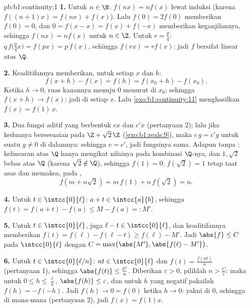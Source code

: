 \begin{solution}{pb:b1:continuity:1}
\textbf{1.} Untuk $n \in \N$: $f(nx) = n f(x)$ lewat induksi
(karena $f((n+1)x) = f(nx) + f(x)$). Lalu $f(0) = 2f(0)$ memberikan $f(0) =
0$, dan $0 = f(x - x) = f(x) + f(-x)$ memberikan keganjilannya, sehingga $f(nx) =
nf(x)$ untuk $n \in \Z$. Untuk $r = \frac pq$: $q\,f\bigl(\tfrac
pq x\bigr) = f(px) = p\,f(x)$, sehingga $f(rx) = r f(x)$: jadi $f$ bersifat
linear atas $\Q$.

\textbf{2.} Keaditifannya memberikan, untuk setiap $x$ dan $h$:
\[
f(x + h) - f(x) = f(h) = f(x_0 + h) - f(x_0) .
\]
Ketika $h \to 0$, ruas kanannya menuju $0$ menurut  di
$x_0$; sehingga $f(x + h) \to f(x)$: jadi  di setiap $x$. Lalu
\cref{exo:b1:continuity:11} menghasilkan $f(x) = f(1)\,x$.

\textbf{3.} Dua fungsi aditif yang  berbentuk
$cx$ dan $c'x$ (pertanyaan 2); lalu jika keduanya bersesuaian pada  
$\Z + \sqrt2\,\Z$ (\cref{exo:b1:reals:9}), maka $c\,g = c'g$ untuk
suatu $g \neq 0$ di dalamnya: sehingga $c = c'$, jadi fungsinya sama. Adapun tanpa
: kelinearan atas $\Q$ hanya mengikat nilainya pada
kombinasi $\Q$-nya, dan $1, \sqrt2$ bebas atas $\Q$ (karena $\sqrt2
\notin \Q$), sehingga $f(1) = 0$, $f(\sqrt2) = 1$ tetap taat asas dan
memaksa, pada ,
\[
f(m + n\sqrt2) = m\,f(1) + n\,f(\sqrt2) = n .
\]

\textbf{4.} Untuk $t \in \intcc{0}{\ell}$: $a + t \in
\intcc{a}{b}$, sehingga $f(t) = f(a + t) - f(a) \leq M - f(a) =: M'$.

\textbf{5.} Untuk $t \in \intcc{0}{\ell}$, juga $\ell - t \in
\intcc{0}{\ell}$, dan keaditifannya memberikan $f(t) = f(\ell) - f(\ell
- t) \geq f(\ell) - M'$. Jadi $\abs{f} \leq C$ pada
$\intcc{0}{\ell}$ dengan $C = \max\bigl(\abs{M'}, \abs{f(\ell) -
M'}\bigr)$.

\textbf{6.} Untuk $t \in \intcc{0}{\ell/n}$: $nt \in
\intcc{0}{\ell}$ dan $f(t) = \frac{f(nt)}{n}$ (pertanyaan 1), sehingga
$\abs{f(t)} \leq \frac Cn$. Diberikan $\varepsilon > 0$, pilihlah $n >
\frac C\varepsilon$: maka untuk $0 \leq h \leq \frac\ell n$,
$\abs{f(h)} \leq \varepsilon$, dan untuk $h$ yang negatif pakailah $f(h) =
-f(-h)$. Jadi $f(h) \to 0 = f(0)$ ketika $h \to 0$: yakni  di $0$,
sehingga di mana-mana (pertanyaan 2), jadi $f(x) = f(1)x$.


\end{solution}
